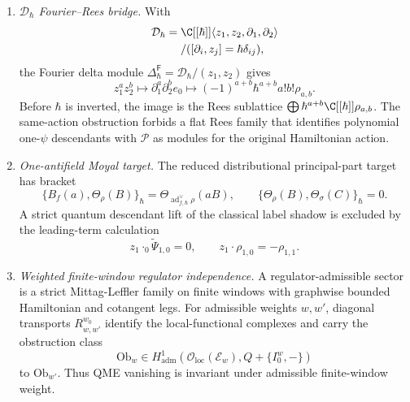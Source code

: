 \begin{enumerate}
  \item \emph{\(\mathcal D_\hbar\) Fourier--Rees bridge.}
  With
  \[
    \begin{aligned}
    \mathcal D_\hbar
    ={}&
    \C[[\hbar]]
      \langle z_1,z_2,\partial_1,\partial_2\rangle\\
    &/
      ([\partial_i,z_j]=\hbar\delta_{ij}),
    \end{aligned}
  \]
  the Fourier delta module
  \(\Delta^{\mathsf F}_\hbar=\mathcal D_\hbar/(z_1,z_2)\) gives
  \[
    z_1^az_2^b\mapsto
    \partial_1^a\partial_2^be_0
    \mapsto
    (-1)^{a+b}\hbar^{a+b}a!b!\rho_{a,b}.
  \]
  Before \(\hbar\) is inverted, the image is the Rees sublattice
  \(\bigoplus\hbar^{a+b}\C[[\hbar]]\rho_{a,b}\).  The same-action
  obstruction forbids a flat Rees family that identifies polynomial
  one-\(\psi\) descendants with \(\mathcal P\) as modules for the
  original Hamiltonian action.

  \item \emph{One-antifield Moyal target.}
  The reduced distributional principal-part target has bracket
  \[
    \{B_f(a),\Theta_\rho(B)\}_\hbar
      =
      \Theta_{\operatorname{ad}^{\vee}_{f,\hbar}\rho}(aB),
    \qquad
    \{\Theta_\rho(B),\Theta_\sigma(C)\}_\hbar=0.
  \]
  A strict quantum descendant lift of the classical label shadow is
  excluded by the leading-term calculation
  \[
    z_1\cdot_0\widetilde\Psi_{1,0}=0,\qquad
    z_1\cdot\rho_{1,0}=-\rho_{1,1}.
  \]

  \item \emph{Weighted finite-window regulator independence.}
  A regulator-admissible sector is a strict Mittag-Leffler family on
  finite windows with graphwise bounded Hamiltonian and cotangent legs.
  For admissible weights \(w,w'\), diagonal transports
  \(R^{w_0}_{w,w'}\) identify the local-functional complexes and carry
  the obstruction class
  \[
    \mathrm{Ob}_w\in
    H^1_{\mathrm{adm}}(\mathcal O_{\mathrm{loc}}(\mathcal E_w),
      Q+\{I_0^w,-\})
  \]
  to \(\mathrm{Ob}_{w'}\).  Thus QME vanishing is invariant under
  admissible finite-window weight.


\end{enumerate}
